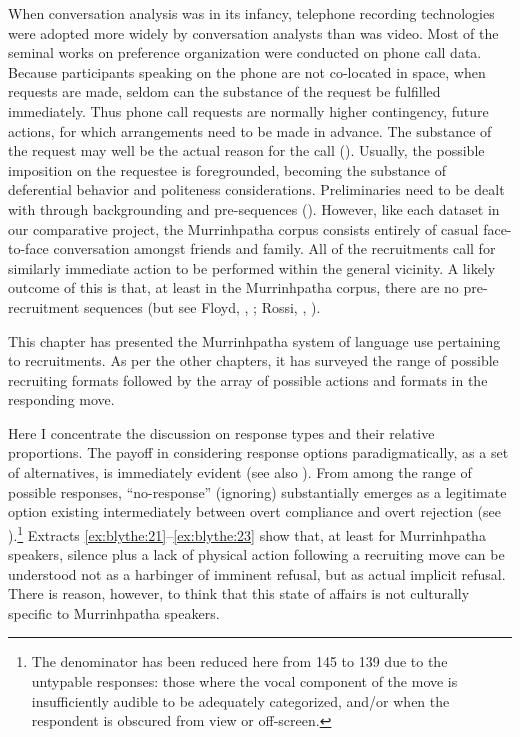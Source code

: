 \documentclass[output=paper,nonflat,colorlinks,citecolor=brown]{langsci/langscibook}
\begin{document}
When conversation analysis was in its infancy, telephone recording technologies were adopted more widely by conversation analysts than was video. Most of the seminal works on preference organization were conducted on phone call data. Because participants speaking on the phone are not co-located in space, when requests are made, seldom can the substance of the request be fulfilled immediately. Thus phone call requests are normally higher contingency, future actions, for which arrangements need to be made in advance. The substance of the request may well be the actual reason for the call (\citealt{Sacks1992,SchegloffSacks1973,Couper-kuhlen2001}). Usually, the possible imposition on the requestee is foregrounded, becoming the substance of deferential behavior and politeness considerations. Preliminaries need to be dealt with through backgrounding and pre-sequences (\citealt{Schegloff1980,Schegloff2002,Schegloff2007sequence}). However, like each dataset in our comparative project, the Murrinhpatha corpus consists entirely of casual face-to-face conversation amongst friends and family. All of the recruitments call for similarly immediate action to be performed within the general vicinity. A likely outcome of this is that, at least in the Murrinhpatha corpus, there are no pre-recruitment sequences (but see Floyd, , ; Rossi, , ).

This chapter has presented the Murrinhpatha system of language use pertaining to recruitments. As per the other chapters, it has surveyed the range of possible recruiting formats followed by the array of possible actions and formats in the responding move.

Here I concentrate the discussion on response types and their relative proportions. The payoff in considering response options paradigmatically, as a set of alternatives, is immediately evident (see also \citealt{ThompsonFoxCouperKuhlen2015}). From among the range of possible responses, “no-response” (ignoring) substantially emerges as a legitimate option existing intermediately between overt compliance and overt rejection (see ).\footnote{The denominator has been reduced here from 145 to 139 due to the untypable responses: those where the vocal component of the move is insufficiently audible to be adequately categorized, and/or when the respondent is obscured from view or off-screen.} Extracts \ref{ex:blythe:21}--\ref{ex:blythe:23} show that, at least for Murrinhpatha speakers, silence plus a lack of physical action following a recruiting move can be understood not as a harbinger of imminent refusal, but as actual implicit refusal. There is reason, however, to think that this state of affairs is not culturally specific to Murrinhpatha speakers.
\end{document}
